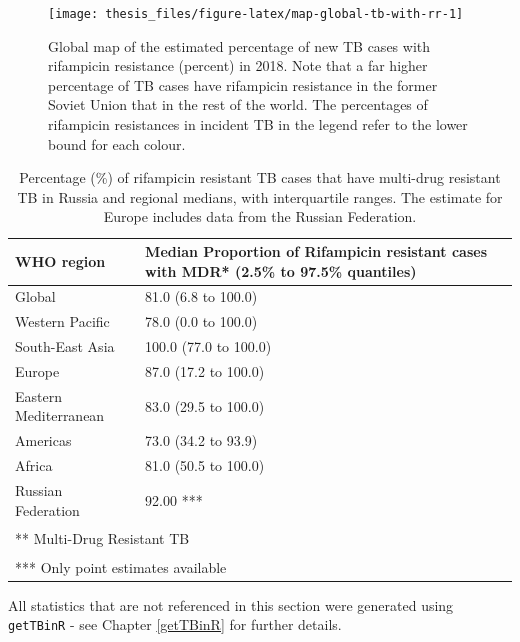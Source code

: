 \documentclass[11pt,twoside]{bristolthesis}
\begin{document}
  \begin{figure}
  
  {\centering \texttt{[image: thesis\_files/figure-latex/map-global-tb-with-rr-1]} 
  
  }
  
  \caption[Global map of the estimated percentage of new TB cases with rifampicin resistance (percent) in 2018.]{Global map of the estimated percentage of new TB cases with rifampicin resistance (percent) in 2018. Note that a far higher percentage of TB cases have rifampicin resistance in the former Soviet Union that in the rest of the world. The percentages of rifampicin resistances in incident TB in the legend refer to the lower bound for each colour.}\label{fig:map-global-tb-with-rr}
  \end{figure}
  \begin{table}[H]
  
  \caption{\label{tab:prop-rr-with-mdr-tab}Percentage (\%) of rifampicin resistant TB cases that have multi-drug resistant TB in Russia and regional medians, with interquartile ranges. The estimate for Europe includes data from the Russian Federation.}
  \centering
  \fontsize{8}{10}\selectfont
  \begin{tabular}{ll}
  \toprule
  WHO region & Median Proportion of Rifampicin resistant cases with MDR* (2.5\% to 97.5\% quantiles)\\
  \midrule
  Global & 81.0 (6.8 to 100.0)\\
  Western Pacific & 78.0 (0.0 to 100.0)\\
  South-East Asia & 100.0 (77.0 to 100.0)\\
  Europe & 87.0 (17.2 to 100.0)\\
  Eastern Mediterranean & 83.0 (29.5 to 100.0)\\
  \addlinespace
  Americas & 73.0 (34.2 to 93.9)\\
  Africa & 81.0 (50.5 to 100.0)\\
  Russian Federation & 92.00 ***\\
  \bottomrule
  \multicolumn{2}{l}{\textsuperscript{} ** Multi-Drug Resistant TB}\\
  \multicolumn{2}{l}{\textsuperscript{} *** Only point estimates available}\\
  \end{tabular}
  \end{table}
  All statistics that are not referenced in this section were generated using \texttt{getTBinR} - see Chapter \ref{getTBinR} for further details.
  
\end{document}
